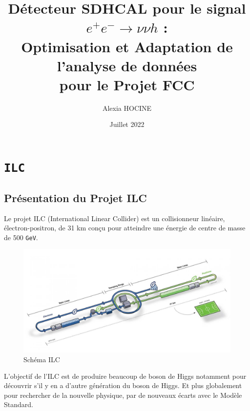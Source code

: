 \documentclass[10pt,a4paper]{report}
\author{Alexia \textsc{HOCINE}}
\title{Détecteur SDHCAL pour le signal  $ e^{+} e^{-} \longrightarrow \nu \nu h $ :\\Optimisation et Adaptation de l'analyse de données\\pour le Projet FCC 
}
\date{Juillet 2022}
\newcommand{\MS}{Modèle Standard\xspace}
\newcommand{\GeV}{\texttt{GeV}}
\begin{document}






\tableofcontents







\chapter{\texttt{ILC}}

\section{Présentation du Projet ILC}

Le projet ILC (International Linear Collider) est un collisionneur linéaire, électron-positron, de 31 km conçu pour atteindre une énergie de centre de masse de 500 \GeV \cite{cern:ilc}. \\

\begin{figure}[h!]
	\center
	\includegraphics[width=\textwidth]{../img/ilc.jpg} 
	\caption{Schéma ILC\cite{cern:ilc}}
	\label{ilc:schema}
\end{figure}

L'objectif de l'ILC est de produire beaucoup de boson de Higgs notamment pour découvrir s'il y en a d'autre génération du boson de Higgs. Et plus globalement pour rechercher de la nouvelle physique, par de nouveaux écarts avec le \MS.\\
\end{document}
